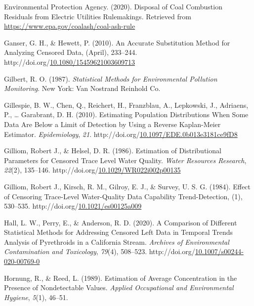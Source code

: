 \documentclass[12pt, twoside]{amherstthesis}
\newenvironment{CSLReferences}%
  {}%
  {\par}
\begin{document}
\begin{CSLReferences}{1}{0}
\leavevmode\hypertarget{ref-Car2020}{}%
Environmental Protection Agency. (2020). {Disposal of Coal Combustion Residuals from Electric Utilities Rulemakings}. Retrieved from \url{https://www.epa.gov/coalash/coal-ash-rule}

\leavevmode\hypertarget{ref-Ganser2010}{}%
Ganser, G. H., \& Hewett, P. (2010). {An Accurate Substitution Method for Analyzing Censored Data}, (April), 233--244. http://doi.org/\href{https://doi.org/10.1080/15459621003609713}{10.1080/15459621003609713}

\leavevmode\hypertarget{ref-Gilbert1987}{}%
Gilbert, R. O. (1987). \emph{{Statistical Methods for Environmental Pollution Monitoring}}. New York: Van Nostrand Reinhold Co.

\leavevmode\hypertarget{ref-Gillespie2010}{}%
Gillespie, B. W., Chen, Q., Reichert, H., Franzblau, A., Lepkowski, J., Adriaens, P., \ldots{} Garabrant, D. H. (2010). {Estimating Population Distributions When Some Data Are Below a Limit of Detection by Using a Reverse Kaplan-Meier Estimator}. \emph{Epidemiology}, \emph{21}. http://doi.org/\href{https://doi.org/10.1097/EDE.0b013e3181ce9fD8}{10.1097/EDE.0b013e3181ce9fD8}

\leavevmode\hypertarget{ref-Gilliom1986}{}%
Gilliom, Robert J., \& Helsel, D. R. (1986). {Estimation of Distributional Parameters for Censored Trace Level Water Quality}. \emph{Water Resources Research}, \emph{22}(2), 135--146. http://doi.org/\href{https://doi.org/10.1029/WR022i002p00135}{10.1029/WR022i002p00135}

\leavevmode\hypertarget{ref-Gillom1984}{}%
Gilliom, Robert J., Kirsch, R. M., Gilroy, E. J., \& Survey, U. S. G. (1984). {Effect of Censoring Trace-Level Water-Quality Data Capability Trend-Detection}, (1), 530--535. http://doi.org/\href{https://doi.org/10.1021/es00125a009}{10.1021/es00125a009}

\leavevmode\hypertarget{ref-Hall2020}{}%
Hall, L. W., Perry, E., \& Anderson, R. D. (2020). {A Comparison of Different Statistical Methods for Addressing Censored Left Data in Temporal Trends Analysis of Pyrethroids in a California Stream}. \emph{Archives of Environmental Contamination and Toxicology}, \emph{79}(4), 508--523. http://doi.org/\href{https://doi.org/10.1007/s00244-020-00769-0}{10.1007/s00244-020-00769-0}

\leavevmode\hypertarget{ref-Hornung1989}{}%
Hornung, R., \& Reed, L. (1989). {Estimation of Average Concentration in the Presence of Nondetectable Values}. \emph{Applied Occupational and Environmental Hygiene}, \emph{5}(1), 46--51.


\end{CSLReferences}
\end{document}
